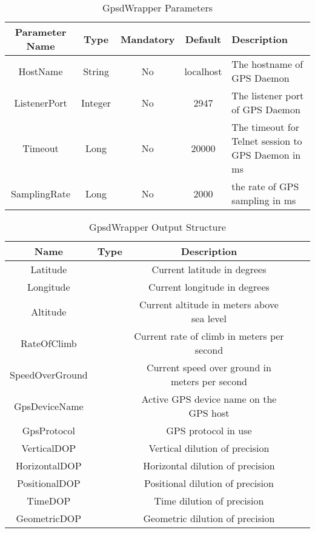 \begin{table*}[!htp]
	\centering
	{\normalfont\footnotesize
	\begin{tabulary}{\textwidth}{|C|C|C|C|J|}%
	\hline
		\textbf{Parameter Name} &
		\textbf{Type} &
		\textbf{Mandatory} &
		\textbf{Default} &
		\textbf{Description} \\
	\hline
	\hline
		HostName &
		String &	
		No &
		localhost &
		The hostname of GPS Daemon \\
	\hline
		ListenerPort &
		Integer &
		No &
		2947 &
		The listener port of GPS Daemon \\
	\hline
		Timeout &
		Long &
		No &
		20000 &
		The timeout for Telnet session to GPS Daemon in ms \\
	\hline 
		SamplingRate &
		Long &
		No &
		2000 &
		the rate of GPS sampling in ms \\
	\hline 
	\end{tabulary}
	}
	\caption{GpsdWrapper Parameters}
	\label{table:gpsd_parameters}
\end{table*}

\begin{table*}[!htp]
	\centering
	{\normalfont\footnotesize
	\begin{tabulary}{\textwidth}{|C|C|C|C|J|}%
	\hline
		\textbf{Name} &
		\textbf{Type} &
		\textbf{Description} \\
	\hline
	\hline
		Latitude &
		 &
		Current latitude in degrees \\
	\hline 
		Longitude &
		 &
		Current longitude in degrees \\
	\hline 
		Altitude &
		 &
		Current altitude in meters above sea level \\
	\hline 
		RateOfClimb &
		 &
		Current rate of climb in meters per second \\
	\hline 
		SpeedOverGround &
		 &
		Current speed over ground in meters per second \\
	\hline 
		GpsDeviceName &
		 &
		Active GPS device name on the GPS host \\
	\hline 
		GpsProtocol &
		 &
		GPS protocol in use \\
	\hline 
		VerticalDOP &
		 &
		Vertical dilution of precision \\
	\hline 
		HorizontalDOP &
		 &
		Horizontal dilution of precision \\
	\hline 
		PositionalDOP &
		 &
		Positional dilution of precision \\
	\hline 
		TimeDOP &
		 &
		Time dilution of precision \\
	\hline 
		GeometricDOP &
		 &
		Geometric dilution of precision \\
	\hline 
	\end{tabulary}
	}
	\caption{GpsdWrapper Output Structure}
	\label{table:gpsd_output_structure}
\end{table*}

